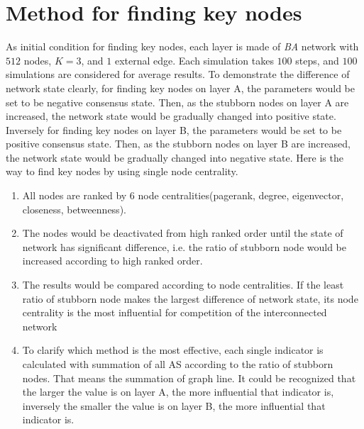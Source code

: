 \section{Method for finding key nodes}
\label{sec:method for finding key nodes}
As initial condition for finding key nodes, each layer is made of \textit{BA} network with $512$ nodes, $K=3$, and $1$ external edge. Each simulation takes $100$ steps, and $100$ simulations are considered for average results. To demonstrate the difference of network state clearly, for finding key nodes on layer A, the parameters would be set to be negative consensus state. Then, as the stubborn nodes on layer A are increased, the network state would be gradually changed into positive state.  Inversely for finding key nodes on layer B, the parameters would be set to be positive consensus state. Then, as the stubborn nodes on layer B are increased, the network state would be gradually changed into negative state.
Here is the way to find key nodes by using single node centrality.
\begin{enumerate}
	\item All nodes are ranked by 6 node centralities(pagerank, degree, eigenvector, closeness, betweenness).
	\item The nodes would be deactivated from high ranked order until the state of network has significant difference, i.e. the ratio of stubborn node would be increased according to high ranked order. 
	\item The results would be compared according to node centralities. If the least ratio of stubborn node makes the largest difference of network state, its node centrality is the most influential for competition of the interconnected network
	\item To clarify which method is the most effective, each single indicator is calculated with summation of all AS according to the ratio of stubborn nodes. That means the summation of graph line. It could be recognized that the larger the value is on layer A, the more influential that indicator is, inversely the smaller the value is on layer B, the more influential that indicator is.
\end{enumerate}

